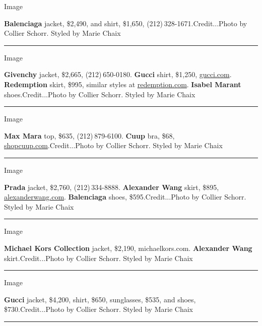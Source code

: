 Image

\textbf{Balenciaga} jacket, \$2,490, and shirt, \$1,650,
(212) 328-1671.Credit...Photo by Collier Schorr. Styled by Marie Chaix

\begin{center}\rule{0.5\linewidth}{\linethickness}\end{center}

Image

\textbf{Givenchy} jacket, \$2,665, (212) 650-0180. \textbf{Gucci} shirt,
\$1,250, \href{https://www.gucci.com/us/en/}{gucci.com}.
\textbf{Redemption} skirt, \$995, similar styles at
\href{https://redemption.com/}{redemption.com}. \textbf{Isabel Marant}
shoes.Credit...Photo by Collier Schorr. Styled by Marie Chaix

\begin{center}\rule{0.5\linewidth}{\linethickness}\end{center}

Image

\textbf{Max Mara} top, \$635, (212) 879-6100. \textbf{Cuup} bra, \$68,
\href{https://shopcuup.com/}{shopcuup.com}.Credit...Photo by Collier
Schorr. Styled by Marie Chaix

\begin{center}\rule{0.5\linewidth}{\linethickness}\end{center}

Image

\textbf{Prada} jacket, \$2,760, (212) 334-8888. \textbf{Alexander Wang}
skirt, \$895,
\href{https://www.alexanderwang.com/us-en/}{alexanderwang.com}.
\textbf{Balenciaga} shoes, \$595.Credit...Photo by Collier Schorr.
Styled by Marie Chaix

\begin{center}\rule{0.5\linewidth}{\linethickness}\end{center}

Image

\textbf{Michael Kors Collection} jacket, \$2,190, michaelkors.com.
\textbf{Alexander Wang} skirt.Credit...Photo by Collier Schorr. Styled
by Marie Chaix

\begin{center}\rule{0.5\linewidth}{\linethickness}\end{center}

Image

\textbf{Gucci} jacket, \$4,200, shirt, \$650, sunglasses, \$535, and
shoes, \$730.Credit...Photo by Collier Schorr. Styled by Marie Chaix

\begin{center}\rule{0.5\linewidth}{\linethickness}\end{center}

